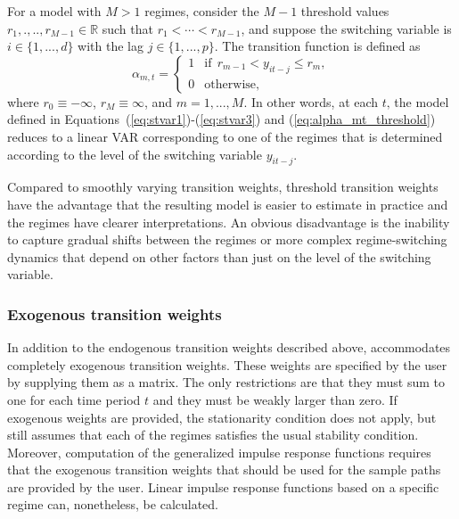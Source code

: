 \documentclass[nojss]{jss}
\begin{document}
For a model with $M>1$ regimes, consider the $M-1$ threshold values $r_1,.,..,r_{M - 1}\in\mathbb{R}$ such that $r_1<\cdots<r_{M-1}$, and suppose the switching variable is $i\in \lbrace 1,...,d \rbrace$ with the lag $j\in \lbrace 1,...,p \rbrace$. The transition function is defined as
\begin{equation}\label{eq:alpha_mt_threshold}
\alpha_{m,t} =
\left\lbrace\begin{matrix}
1 & \text{if} \ \ r_{m-1} < y_{it-j} \leq r_{m}, \\
0 & \text{otherwise}, \phantom{aaaaaaaaa}
\end{matrix}\right.
\end{equation}
where $r_0\equiv-\infty$, $r_M\equiv\infty$, and $m=1,...,M$. In other words, at each $t$‚ the model defined in Equations~(\ref{eq:stvar1})-(\ref{eq:stvar3}) and (\ref{eq:alpha_mt_threshold}) reduces to a linear VAR corresponding to one of the regimes that is determined according to the level of the switching variable $y_{it-j}$.

Compared to smoothly varying transition weights, threshold transition weights have the advantage that the resulting model is easier to estimate in practice and the regimes have clearer interpretations. An obvious disadvantage is the inability to capture gradual shifts between the regimes or more complex regime-switching dynamics that depend on other factors than just on the level of the switching variable.

\subsubsection{Exogenous transition weights}
In addition to the endogenous transition weights described above,  accommodates completely exogenous transition weights. These weights are specified by the user by supplying them as a matrix. The only restrictions are that they must sum to one for each time period $t$ and they must be weakly larger than zero. If exogenous weights are provided, the stationarity condition does not apply, but  still assumes that each of the regimes satisfies the usual stability condition. Moreover, computation of the generalized impulse response functions requires that the exogenous transition weights that should be used for the sample paths are provided by the user. Linear impulse response functions based on a specific regime can, nonetheless, be calculated.
\end{document}
